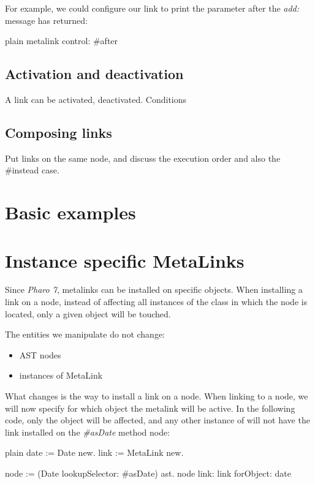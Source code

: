 \documentclass[10pt,twoside,english]{_support/latex/sbabook/sbabook}
\begin{document}
For example, we could configure our link to print the parameter after the \textit{add:} message has returned:

\begin{displaycode}{plain}
metalink control: #after
\end{displaycode}

\subsection{Activation and deactivation}
A link can be activated, deactivated.
Conditions
\subsection{Composing links}
Put links on the same node, and discuss the execution order and also the \#instead case.
\section{Basic examples}\section{Instance specific MetaLinks}
Since \textit{Pharo 7}, metalinks can be installed on specific objects.  When installing a link on a node, instead of affecting all instances of the class in which the node is located, only a given object will be touched.

The entities we manipulate do not change:

\begin{itemize}
\item AST nodes
\item instances of MetaLink
\end{itemize}

What changes is the way to install a link on a node. When linking to a node, we will now specify for which object the metalink will be active. In the following code, only the  object will be affected, and any other instance of  will not have the link installed on the \textit{\#asDate} method node:

\begin{displaycode}{plain}
date := Date new.
link := MetaLink new.

node := (Date lookupSelector: #asDate) ast.
node link: link forObject: date
\end{displaycode}
\end{document}
